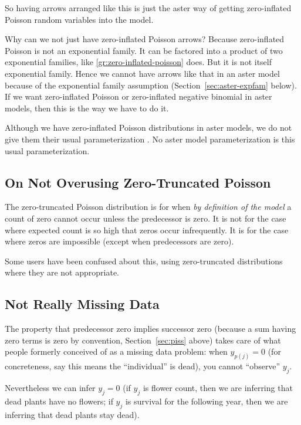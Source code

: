 So having arrows arranged like this is just the aster way of getting
zero-inflated Poisson random variables into the model.

Why can we not just have zero-inflated Poisson arrows?  Because
zero-inflated Poisson is not an exponential family.  It can be factored
into a product of two exponential families, like
\eqref{gr:zero-inflated-poisson} does.  But it is not itself exponential
family.  Hence we cannot have arrows like that in an aster model
because of the exponential family assumption (Section~\ref{sec:aster-expfam}
below).  If we want zero-inflated Poisson or zero-inflated negative binomial
in aster models, then this is the way we have to do it.

Although we have zero-inflated Poisson distributions in aster models,
we do not give them their usual parameterization \citep{lambert}.
No aster model parameterization
is this usual parameterization.

\subsection{On Not Overusing Zero-Truncated Poisson}

The zero-truncated Poisson distribution is for when \emph{by definition
of the model} a count of zero cannot occur unless the predecessor is zero.
It is not for the case where expected count is so high
that zeros occur infrequently.
It is for the case where zeros are impossible (except when predecessors
are zero).

Some users have been confused about this, using zero-truncated distributions
where they are not appropriate.

\subsection{Not Really Missing Data}
\label{sec:miss}

The property that predecessor zero implies successor zero
(because a sum having zero terms is zero by convention,
Section~\ref{sec:piss} above)
takes care of what people formerly conceived of as a missing data problem:
when $y_{p(j)} = 0$ (for concreteness, say this means the ``individual''
is dead), you cannot ``observe'' $y_j$.

Nevertheless we can infer $y_j = 0$
(if $y_j$ is flower count, then we are inferring that dead plants have
no flowers; if $y_j$ is survival for the following year, then we are
inferring that dead plants stay dead).

